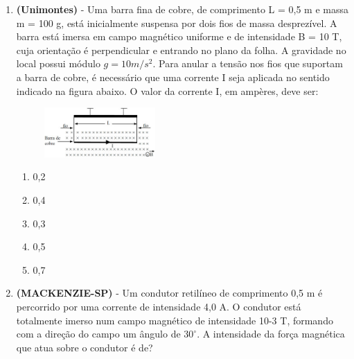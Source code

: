 \documentclass[12pt,letterpaper,fleqn]{article}
\begin{document}
\begin{itemize}
\begin{enumerate}
            \item \textbf{(Unimontes)} - Uma barra fina de cobre, de comprimento L = 0,5 m e massa m = 100 g, está inicialmente suspensa por dois fios de massa desprezível. A barra está imersa em campo magnético uniforme e de intensidade B = 10 T, cuja orientação é perpendicular e entrando no plano da folha. A gravidade no local possui módulo $g = 10 m/s^2$. Para anular a tensão nos fios que suportam a barra de cobre, é necessário que uma corrente I seja aplicada no sentido indicado na figura abaixo. O valor da corrente I, em ampères, deve ser:
            
            \pagebreak
            \begin{figure}[h]
                \centering
                \includegraphics[width=0.4\textwidth]{ex_12_forca.jpg}
            \end{figure}
            
            \begin{enumerate}
                \item 0,2
                \item 0,4
                \item 0,3
                \item 0,5
                \item 0,7
            \end{enumerate}
            
            \item \textbf{(MACKENZIE-SP)} - Um condutor retilíneo de comprimento 0,5 m é percorrido por uma corrente de intensidade 4,0 A. O condutor está totalmente imerso num campo magnético de intensidade 10-3 T, formando com a direção do campo um ângulo de $30^{\circ}$. A intensidade da força magnética que atua sobre o condutor é de?
            

\end{enumerate}
\end{itemize}
\end{document}
